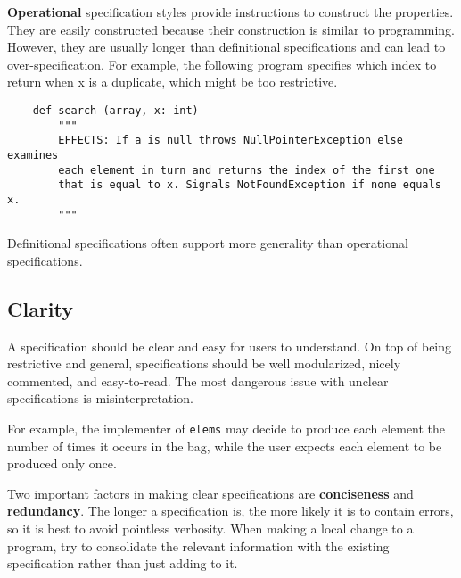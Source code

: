 \documentclass[oneside,11pt,dvipsnames]{book}
\newcommand{\code}[1]{\texttt{#1}}
\begin{document}
\textbf{Operational} specification styles provide instructions to construct the properties. They are easily constructed because their construction is similar to programming. However, they are usually longer than definitional specifications and can lead to over-specification. For example, the following program specifies which index to return when x is a duplicate, which might be too restrictive.
\begin{lstlisting}
    def search (array, x: int)
        """
        EFFECTS: If a is null throws NullPointerException else examines
        each element in turn and returns the index of the first one
        that is equal to x. Signals NotFoundException if none equals x.
        """

\end{lstlisting}

Definitional specifications often support more generality than operational specifications.

\subsection{Clarity}
A specification should be clear and easy for users to understand. On top of being restrictive and general, specifications should be well modularized, nicely commented, and easy-to-read. The most dangerous issue with unclear specifications is misinterpretation.

For example, the implementer of \code{elems} may decide to produce each element the number of times it occurs in the bag, while the user expects each element to be produced only once.

Two important factors in making clear specifications are \textbf{conciseness} and \textbf{redundancy}. The longer a specification is, the more likely it is to contain errors, so it is best to avoid pointless verbosity. When making a local change to a program, try to consolidate the relevant information with the existing specification rather than just adding to it. 
\end{document}
